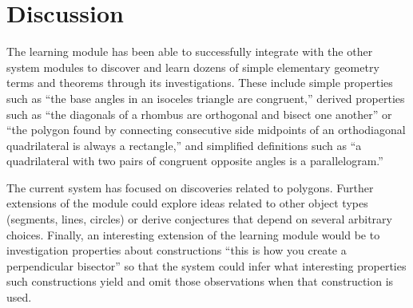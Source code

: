\newpage
\section{Discussion}

The learning module has been able to successfully integrate with the
other system modules to discover and learn dozens of simple elementary
geometry terms and theorems through its investigations. These include
simple properties such as ``the base angles in an isoceles triangle
are congruent,'' derived properties such as ``the diagonals of a
rhombus are orthogonal and bisect one another'' or ``the polygon found
by connecting consecutive side midpoints of an orthodiagonal
quadrilateral is always a rectangle,'' and simplified definitions such
as ``a quadrilateral with two pairs of congruent opposite angles is a
parallelogram.''

The current system has focused on discoveries related to
polygons. Further extensions of the module could explore ideas related
to other object types (segments, lines, circles) or derive conjectures
that depend on several arbitrary choices. Finally, an interesting
extension of the learning module would be to investigation properties
about constructions ``this is how you create a perpendicular
bisector'' so that the system could infer what interesting properties
such constructions yield and omit those observations when that
construction is used.

